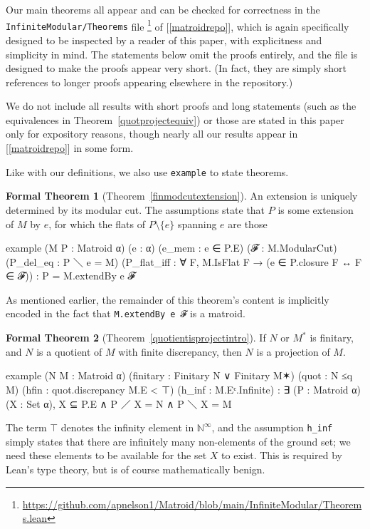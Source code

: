 \documentclass{amsart}
\theoremstyle{plain}
\theoremstyle{definition}
\newcommand{\enn}{\mathbb{N}^{\infty}}
\newcommand{\del}{\!\setminus\!}
\newcommand{\smalltt}[1]{{\small\texttt{#1}}}
\newtheorem*{fthm}{Formal Theorem}
\begin{document}
Our main theorems all appear and can be checked for correctness 
in the \smalltt{InfiniteModular/Theorems}
file
\footnote{\scriptsize \url{https://github.com/apnelson1/Matroid/blob/main/InfiniteModular/Theorems.lean}} 
of [\ref{matroidrepo}], 
which is again specifically designed to be inspected by a reader of this paper, 
with explicitness and simplicity in mind. The statements below omit 
the proofs entirely, and the file is designed to make the proofs appear very short. 
(In fact, they are simply short references to longer proofs appearing 
elsewhere in the repository.)

We do not include all results with short proofs and long statements
(such as the equivalences in Theorem~\ref{quotprojectequiv})
or those are stated in this paper only for expository reasons,
though nearly all our results appear in [\ref{matroidrepo}] in some form. 


Like with our definitions, we also use \smalltt{example} to state theorems. 

\begin{fthm}[Theorem~\ref{finmodcutextension}]
  An extension is uniquely determined by its modular cut. 
  The assumptions state that $P$ is some extension of $M$ by $e$, 
  for which the flats of $P \del \{e\}$ spanning $e$ are those 
  \begin{leancode}
example (M P : Matroid α) (e : α) (e_mem : e ∈ P.E) (𝓕 : M.ModularCut)
  (P_del_eq : P ＼ {e} = M) 
  (P_flat_iff : ∀ F, M.IsFlat F → (e ∈ P.closure F ↔ F ∈ 𝓕)) :
  P = M.extendBy e 𝓕
  \end{leancode}
  As mentioned earlier, the remainder of this theorem's content 
  is implicitly encoded in the fact that \smalltt{M.extendBy e 𝓕}
  is a matroid. 
\end{fthm}

\begin{fthm}[Theorem~\ref{quotientisprojectintro}]
  If $N$ or $M^*$ is finitary, and $N$ is a quotient of $M$ with finite discrepancy,
  then $N$ is a projection of $M$. 
  \begin{leancode}
example (N M : Matroid α) (finitary : Finitary N ∨ Finitary M✶) 
  (quot : N ≤q M) (hfin : quot.discrepancy M.E < ⊤) 
  (h_inf : M.Eᶜ.Infinite) :
  ∃ (P : Matroid α) (X : Set α), X ⊆ P.E ∧ P ／ X = N ∧ P ＼ X = M
  \end{leancode}
  The term $\top$ denotes the infinity element in $\enn$, and
  the assumption \smalltt{h\_inf} simply states that there are infinitely many 
  non-elements of the ground set; we need these elements to be available 
  for the set $X$ to exist. This is required by Lean's type theory, 
  but is of course mathematically benign. 
\end{fthm}
\end{document}
